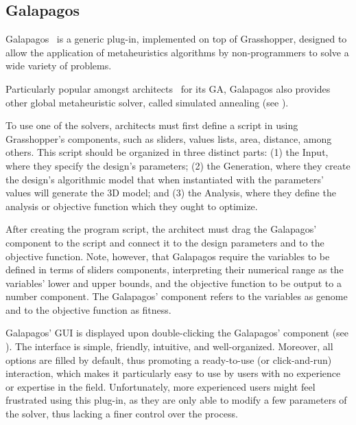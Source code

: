 \subsection{Galapagos}
\label{subsec:galapagos}
Galapagos~\cite{GALAPAGOS} is a generic plug-in, implemented on top of Grasshopper, designed to allow the application of metaheuristics algorithms by non-programmers to solve a wide variety of problems. 

Particularly popular amongst architects~\cite{Wortmann2017ADO} for its \ac{GA}, Galapagos also provides other global metaheuristic solver, called simulated annealing (see ). 

To use one of the solvers, architects must first define a script in using Grasshopper's components, such as sliders, values lists, area, distance, among others. This script should be organized in three distinct parts: (1) the Input, where they specify the design's parameters; (2) the Generation, where they create the design's algorithmic model that when instantiated with the parameters' values will generate the 3D model; and (3) the Analysis, where they define the analysis or objective function which they ought to optimize. 

After creating the program script, the architect must drag the Galapagos' component to the script and connect it to the design parameters and to the objective function. Note, however, that Galapagos require the variables to be defined in terms of sliders components, interpreting their numerical range as the variables' lower and upper bounds, and the objective function to be output to a number component. The Galapagos' component refers to the variables as genome and to the objective function as fitness.

Galapagos' \ac{GUI} is displayed upon double-clicking the Galapagos' component (see ). The interface is simple, friendly, intuitive, and well-organized. Moreover, all options are filled by default, thus promoting a ready-to-use (or click-and-run) interaction, which makes it particularly easy to use by users with no experience or expertise in the field. Unfortunately, more experienced users might feel frustrated using this plug-in, as they are only able to modify a few parameters of the solver, thus lacking a finer control over the process. 

